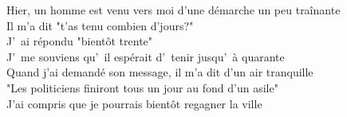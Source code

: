 Hier, un homme est venu vers moi d'une démarche un peu traînante \\
Il m'a dit "t'as tenu combien d'jours?" \\
J'~ai répondu "bientôt trente" \\
J'~me souviens qu'~il espérait d'~tenir jusqu'~à quarante \\

Quand j'ai demandé son message, il m'a dit d'un air tranquille \\
"Les politiciens finiront tous un jour au fond d'un asile" \\
J'ai compris que je pourrais bientôt regagner la ville \\
